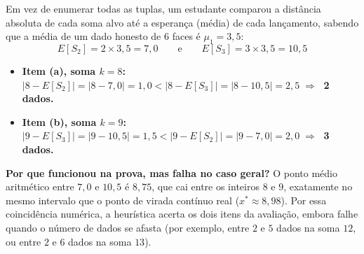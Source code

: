 \documentclass[10pt,a4paper]{article}
\begin{document}
\begin{heuristicbox}[title={Resolução alternativa apresentada em prova (Heurística da Distância até a Média)}]
Em vez de enumerar todas as tuplas, um estudante comparou a distância absoluta de cada soma alvo até a esperança (média) de cada lançamento, sabendo que a média de um dado honesto de $6$ faces é $\mu_1 = 3{,}5$:
\[
E[S_2] = 2 \times 3{,}5 = 7{,}0 \qquad \text{e} \qquad E[S_3] = 3 \times 3{,}5 = 10{,}5
\]
\vspace{-0.6em}
\begin{itemize}[leftmargin=1.5em, itemsep=0.2em, topsep=0.1em]
    \item \textbf{Item (a), soma $k = 8$:} \quad
    $|8 - E[S_2]| = |8 - 7{,}0| = 1{,}0 < |8 - E[S_3]| = |8 - 10{,}5| = 2{,}5 \;\Longrightarrow\;$ \textbf{2 dados.}
    \item \textbf{Item (b), soma $k = 9$:} \quad
    $|9 - E[S_3]| = |9 - 10{,}5| = 1{,}5 < |9 - E[S_2]| = |9 - 7{,}0| = 2{,}0 \;\Longrightarrow\;$ \textbf{3 dados.}
\end{itemize}
\vspace{0.1em}
\textbf{Por que funcionou na prova, mas falha no caso geral?} O ponto médio aritmético entre $7{,}0$ e $10{,}5$ é $8{,}75$, que cai entre os inteiros $8$ e $9$, exatamente no mesmo intervalo que o ponto de virada contínuo real ($x^* \approx 8{,}98$). Por essa coincidência numérica, a heurística acerta os dois itens da avaliação, embora falhe quando o número de dados se afasta (por exemplo, entre $2$ e $5$ dados na soma $12$, ou entre $2$ e $6$ dados na soma $13$).
\end{heuristicbox}
\end{document}
